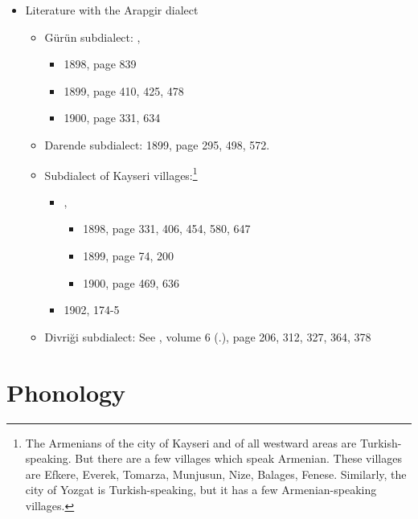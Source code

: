 \begin{itemize}
	\item Literature with the Arapgir dialect
	\begin{itemize}
		\item Gürün subdialect: , 
		\begin{itemize}
			\item 1898, page 839 
			\item 1899, page 410, 425, 478 
			\item 1900, page 331, 634
			
		\end{itemize}
		
		\item Darende subdialect:  1899, page 295, 498, 572. 
		\item 
		Subdialect of Kayseri villages:\footnote{The Armenians of the city of Kayseri and of all westward areas are Turkish-speaking. But there are a few villages which speak Armenian. These villages are Efkere, Everek, Tomarza, Munjusun, Nize, Balages, Fenese. Similarly, the city of Yozgat is Turkish-speaking, but it has a few Armenian-speaking villages.} 
		\begin{itemize}
			\item {},
			\begin{itemize}
				\item 1898, page 331, 406, 454, 580, 647 
				\item 1899, page 74, 200 
				\item 1900, page 469, 636
			\end{itemize}
			\item {} 1902,  174-5
		\end{itemize}
		
		\item Divriği subdialect: See , volume 6 (.), page 206, 312, 327, 364, 378
		
	\end{itemize}
\end{itemize}



\begin{adjarianpage}\label{page:216}\end{adjarianpage}%


\section{Phonology}

